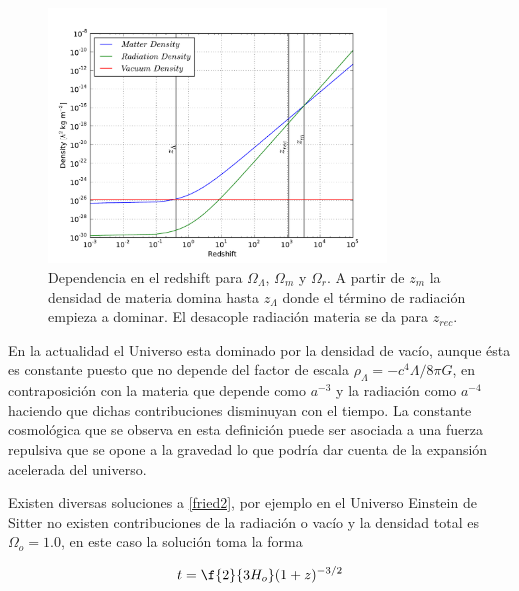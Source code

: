 \begin{figure}[htbp]
       \centering
               \includegraphics[width=0.8\textwidth]{Images/chapter2/density.pdf}
       \caption{ \small Dependencia en el redshift para $\Omega_\Lambda$, $\Omega_m$ y $\Omega_r$.
       A partir de $z_m$ la densidad de materia domina hasta $z_\Lambda$ 
       donde el término de radiación empieza a dominar. El desacople radiación materia 
       se da para $z_{rec}$. }
       \label{densidad}
 \end{figure}

En la actualidad el Universo esta dominado por la densidad de vacío, aunque ésta 
es constante puesto que no depende del factor de escala $\rho_{\Lambda}=-c^4\Lambda/8\pi G$,
en contraposición con la materia que depende como $a^{-3}$ y la radiación como $a^{-4}$ 
haciendo que dichas contribuciones disminuyan con el tiempo. 
La constante cosmológica que se observa en esta definición puede ser asociada a una fuerza 
repulsiva que se opone a la gravedad lo que podría dar cuenta de la expansi\'on 
acelerada del universo. 

Existen diversas soluciones a \ref{fried2}, por ejemplo en el Universo Einstein 
de Sitter no existen contribuciones de la radiación o vacío y la densidad total 
es $\Omega_o=1.0$, en este caso la solución toma la forma 

\[
t = \f{2}{3H_o}(1+z)^{-3/2}
\]

